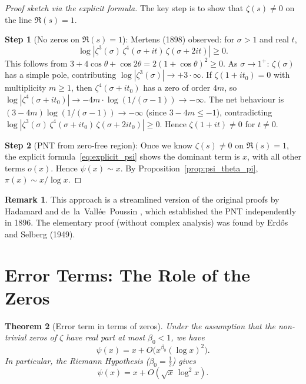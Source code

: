 \documentclass[12pt,a4paper]{amsart}
\newtheorem{theorem}{Theorem}[section]
\theoremstyle{definition}
\newtheorem{remark}[theorem]{Remark}
\begin{document}
\begin{proof}[Proof sketch via the explicit formula]
The key step is to show that $\zeta(s) \ne 0$ on the line $\Re(s) = 1$.

\textbf{Step 1} (No zeros on $\Re(s) = 1$):
Mertens (1898) observed: for $\sigma > 1$ and real $t$,
\[
  \log|\zeta^3(\sigma)\,\zeta^4(\sigma+it)\,\zeta(\sigma+2it)| \ge 0.
\]
This follows from $3 + 4\cos\theta + \cos 2\theta = 2(1+\cos\theta)^2 \ge 0$.
As $\sigma \to 1^+$: $\zeta(\sigma)$ has a simple pole, contributing
$\log|\zeta^3(\sigma)| \to +3\cdot\infty$. If $\zeta(1+it_0) = 0$ with
multiplicity $m \geq 1$, then $\zeta^4(\sigma+it_0)$ has a zero of order $4m$,
so $\log|\zeta^4(\sigma+it_0)| \to -4m \cdot \log(1/(\sigma-1)) \to -\infty$.
The net behaviour is $(3 - 4m)\log(1/(\sigma-1)) \to -\infty$ (since $3-4m \leq -1$),
contradicting $\log|\zeta^3(\sigma)\,\zeta^4(\sigma+it_0)\,\zeta(\sigma+2it_0)| \ge 0$.
Hence $\zeta(1+it) \ne 0$ for $t \ne 0$.

\textbf{Step 2} (PNT from zero-free region):
Once we know $\zeta(s) \ne 0$ on $\Re(s) = 1$, the explicit
formula~\eqref{eq:explicit_psi} shows the dominant term is $x$,
with all other terms $o(x)$.  Hence $\psi(x) \sim x$.
By Proposition~\ref{prop:psi_theta_pi}, $\pi(x) \sim x/\log x$.
\end{proof}

\begin{remark}
This approach is a streamlined version of the original proofs by
Hadamard \cite{Hadamard1896} and de~la~Vall\'ee~Poussin \cite{Poussin1896},
which established the PNT independently in 1896.
The elementary proof (without complex analysis) was found by
Erd\H{o}s and Selberg (1949).
\end{remark}

\section{Error Terms: The Role of the Zeros}

\begin{theorem}[Error term in terms of zeros]
\label{thm:error_term}
Under the assumption that the non-trivial zeros of $\zeta$ have real part
at most $\beta_0 < 1$, we have
\[
  \psi(x) = x + O\!\bigl(x^{\beta_0}(\log x)^2\bigr).
\]
In particular, the Riemann Hypothesis ($\beta_0 = \tfrac{1}{2}$) gives
\[
  \psi(x) = x + O(\sqrt{x}\,\log^2 x).
\]
\end{theorem}
\end{document}
